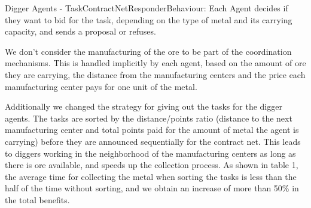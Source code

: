 Digger Agents - TaskContractNetResponderBehaviour:
Each Agent decides if they want to bid for the task, depending on the type of metal and its carrying capacity, and sends a proposal or refuses.

We don’t consider the manufacturing of the ore to be part of the coordination mechanisms. This is handled implicitly by each agent, based on the amount of ore they are carrying, the distance from the manufacturing centers and the price each manufacturing center pays for one unit of the metal.


Additionally we changed the strategy for giving out the tasks for the digger agents. The tasks are sorted by the distance/points ratio (distance to the next manufacturing center and total points paid for the amount of metal the agent is carrying) before they are announced sequentially for the contract net. This leads to diggers working in the neighborhood of the manufacturing centers as long as there is ore available, and speeds up the collection process. As shown in table 1, the average time for collecting the metal when sorting the tasks is less than the half of the time without sorting, and we obtain an increase of more than 50\% in the total benefits.

